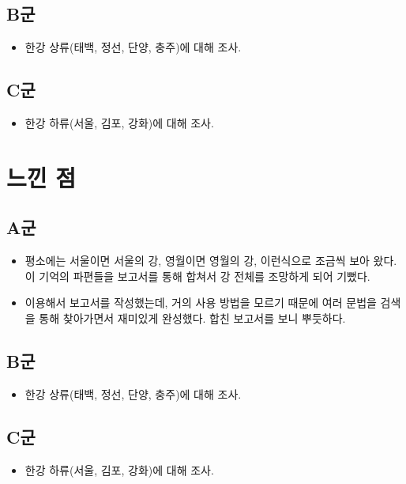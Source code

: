 \documentclass[chapter, oneside]{oblivoir}
\begin{document}
\subsection{B군}
\begin{itemize}
    \item 한강 상류(태백, 정선, 단양, 충주)에 대해 조사.
\end{itemize}
\subsection{C군}
\begin{itemize}
    \item 한강 하류(서울, 김포, 강화)에 대해 조사.
\end{itemize}


\section{느낀 점}
\subsection{A군}
\begin{itemize}
    \item 평소에는 서울이면 서울의 강, 영월이면 영월의 강, 이런식으로 조금씩 보아 왔다. 이 기억의 파편들을 보고서를 통해 합쳐서 강 전체를 조망하게 되어 기뻤다.
    \item {} 이용해서 보고서를 작성했는데, 거의 사용 방법을 모르기 때문에 여러 문법을 검색을 통해 찾아가면서 재미있게 완성했다. 합친 보고서를 보니 뿌듯하다.
\end{itemize}
\subsection{B군}
\begin{itemize}
    \item 한강 상류(태백, 정선, 단양, 충주)에 대해 조사.
\end{itemize}
\subsection{C군}
\begin{itemize}
    \item 한강 하류(서울, 김포, 강화)에 대해 조사.
\end{itemize}
\end{document}
